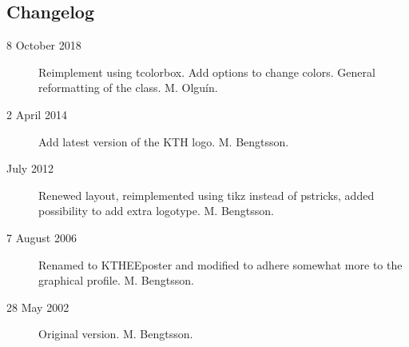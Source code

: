 \documentclass[portrait, a0]{KTHEEposter}
\begin{document}
\begin{pcolumns}[3]
\begin{pcolumn}[3]
\begin{pframe}[1.5]
                \section{Changelog}
                \begin{description}
                    \item[8 October 2018] Reimplement using tcolorbox. 
                    Add options to change colors. 
                    General reformatting of the class. M. Olguín.
                    \item[2 April 2014] Add latest version of the KTH logo. M. Bengtsson.
                    \item[July 2012] Renewed layout, reimplemented using tikz instead of pstricks, added possibility to add extra logotype. M. Bengtsson.
                    \item[7 August 2006] Renamed to KTHEEposter and modified to adhere somewhat more to the graphical profile. M. Bengtsson.
                    \item[28 May 2002] Original version. M. Bengtsson.
                \end{description}
            \end{pframe}
        \end{pcolumn}%
    \end{pcolumns}%
    
\end{document}
